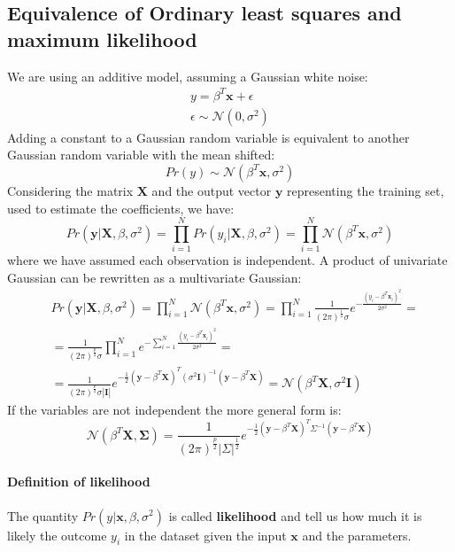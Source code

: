 \documentclass[12pt, letterpaper]{article}
\theoremstyle{definition}
\newcommand{\X}{\mathrm{\mathbf{X}}}
\newcommand{\y}{\mathbf{y}}
\newcommand{\x}{\mathbf{x}}
\begin{document}
\subsection{Equivalence of Ordinary least squares and 	maximum likelihood}
We are using an additive model, assuming a Gaussian white noise:
\begin{align}
y = \beta^T \x + \epsilon \\
\epsilon \sim \mathcal{N}(0,\sigma^2)
\end{align}
Adding a constant to a Gaussian random variable is equivalent to another Gaussian random variable with the mean shifted:
\begin{equation}
Pr(y) \sim \mathcal{N}(\beta^T \x ,\sigma^2)
\end{equation}
Considering the matrix $\X$ and the output vector $\y$ representing the training set, used to estimate the coefficients, we have:
\begin{equation}
Pr(\y|\X, \beta, \sigma^2)  = \prod_{i=1}^N Pr(y_i|\X, \beta, \sigma^2) =  \prod_{i=1}^N \mathcal{N}(\beta^T \x ,\sigma^2)
\end{equation}
where we have assumed each observation is independent. A product of univariate Gaussian can be rewritten as a multivariate Gaussian:
\begin{equation}
\label{multiGauss}
\begin{aligned}
 &Pr(\y|\X, \beta, \sigma^2)  = \prod_{i=1}^N \mathcal{N}(\beta^T \x ,\sigma^2) =  \prod_{i=1}^N \frac{1}{(2\pi)^{\frac{1}{2}}\sigma}e^{-\frac{\left(y_i-\beta^T\x_i\right)^2} {2\sigma^2}}= \\
 &= \frac{1}{(2\pi)^{\frac{p}{2}}\sigma}\prod_{i=1}^N e^{-\sum_{i=1}^N \frac{\left(y_i-\beta^T\x_i\right)^2} {2\sigma^2}} = \\
 &=  \frac{1}{(2\pi)^{\frac{p}{2}}\sigma|\mathbf{I}|}e^{-\frac{1}{2}\left(\y-\beta^T\X\right)^T\left(\sigma^2 \mathbf{I}\right)^{-1}\left(\y-\beta^T\X\right)} = \mathcal{N}(\beta^T \X ,\sigma^2\mathbf{I}) 
\end{aligned}
\end{equation}
If the variables are not independent the more general form is:
\begin{equation}
\mathcal{N}(\beta^T \X ,\mathbf{\Sigma}) =\frac{1}{(2\pi)^{\frac{p}{2}}|\Sigma|^\frac{1}{2}}e^{-\frac{1}{2}\left(\y-\beta^T\X\right)^T\Sigma^{-1}\left(\y-\beta^T\X\right)}
\end{equation}

\paragraph{Definition of likelihood}
The quantity $Pr(y|\x, \beta, \sigma^2)$ is called \textbf{likelihood} and tell us how much it is likely the outcome $y_i$ in the dataset given the input $\x$ and the parameters.
\end{document}
